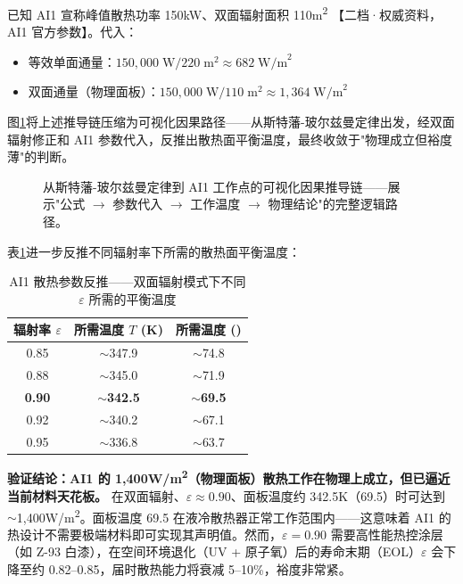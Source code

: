 已知 AI1 宣称峰值散热功率 150\;kW、双面辐射面积 110\;m\textsuperscript{2} 【二档·权威资料，AI1 官方参数\cite{spacex2026ai1}】。代入：

\begin{itemize}[leftmargin=*]
    \item 等效单面通量：$150,000\;\text{W} / 220\;\text{m}^2 \approx 682\;\text{W/m}^2$
    \item 双面通量（物理面板）：$150,000\;\text{W} / 110\;\text{m}^2 \approx 1,364\;\text{W/m}^2$
\end{itemize}

图\ref{fig:sb_causal_chain}将上述推导链压缩为可视化因果路径——从斯特藩-玻尔兹曼定律出发，经双面辐射修正和 AI1 参数代入，反推出散热面平衡温度，最终收敛于"物理成立但裕度薄"的判断。

\begin{figure}[H]
\centering

\caption{从斯特藩-玻尔兹曼定律到 AI1 工作点的可视化因果推导链——展示"公式 $\to$ 参数代入 $\to$ 工作温度 $\to$ 物理结论"的完整逻辑路径。}
\label{fig:sb_causal_chain}
\end{figure}

表\ref{tab:ai1_temperature}进一步反推不同辐射率下所需的散热面平衡温度：

\begin{table}[H]
\centering
\caption{AI1 散热参数反推——双面辐射模式下不同 $\varepsilon$ 所需的平衡温度}
\label{tab:ai1_temperature}
\begin{tabular}{ccc}
\toprule
\textbf{辐射率 $\varepsilon$} & \textbf{所需温度 $T$ (K)} & \textbf{所需温度 (\unitC{})} \\
\midrule
0.85 & $\sim$347.9 & $\sim$74.8 \\
0.88 & $\sim$345.0 & $\sim$71.9 \\
\textbf{0.90} & \textbf{$\sim$342.5} & \textbf{$\sim$69.5} \\
0.92 & $\sim$340.2 & $\sim$67.1 \\
0.95 & $\sim$336.8 & $\sim$63.7 \\
\bottomrule
\end{tabular}
\end{table}

\textbf{验证结论：AI1 的 1,400\;W/m\textsuperscript{2}（物理面板）散热工作在物理上成立，但已逼近当前材料天花板。} 在双面辐射、$\varepsilon\approx 0.90$、面板温度约 342.5\;K（69.5\unitC{}）时可达到 $\sim$1,400\;W/m\textsuperscript{2}。面板温度 69.5\unitC{} 在液冷散热器正常工作范围内——这意味着 AI1 的热设计不需要极端材料即可实现其声明值。然而，$\varepsilon=0.90$ 需要高性能热控涂层（如 Z-93 白漆），在空间环境退化（UV + 原子氧）后的寿命末期（EOL）$\varepsilon$ 会下降至约 0.82--0.85，届时散热能力将衰减 5--10\%，裕度非常紧\cite{nasa2024sst,nasa1993thermal}。

